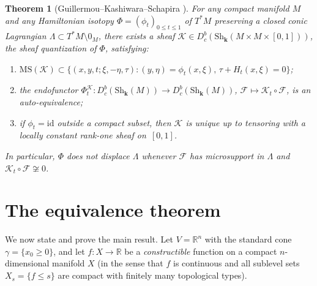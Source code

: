 \documentclass[12pt,a4paper]{amsart}
\newtheorem{theorem}{Theorem}[section]
\theoremstyle{definition}
\newcommand{\R}{\mathbb{R}}
\newcommand{\kk}{\mathbf{k}}                %
\newcommand{\Sh}{\mathrm{Sh}}               %
\newcommand{\Dbc}{D^b_c}                     %
\newcommand{\MS}{\mathrm{MS}}               %
\newcommand{\id}{\mathrm{id}}
\newcommand{\TsM}{T^*M}                     %
\begin{document}
\begin{theorem}[{Guillermou--Kashiwara--Schapira \cite[Thm.~1.7]{GKS2012}}]
  \label{thm:gks}
  For any compact manifold $M$ and any Hamiltonian isotopy
  $\Phi = (\phi_t)_{0 \leq t \leq 1}$ of $\TsM$ preserving a closed
  conic Lagrangian $\Lambda \subset \TsM \setminus 0_M$, there exists a
  sheaf $\mathcal{K} \in \Dbc(\Sh_\kk(M \times M \times [0,1]))$, the
  \emph{sheaf quantization of $\Phi$}, satisfying:
  \begin{enumerate}
    \item[\textup{(i)}]
      $\MS(\mathcal{K}) \subset \{(x,y,t;\xi,-\eta,\tau) : (y,\eta) =
      \phi_t(x,\xi),\, \tau + H_t(x,\xi) = 0\}$;
    \item[\textup{(ii)}]
      the endofunctor $\Phi_t^{\mathcal{K}}:
      \Dbc(\Sh_\kk(M)) \to \Dbc(\Sh_\kk(M))$,
      $\mathcal{F} \mapsto \mathcal{K}_t \circ \mathcal{F}$,
      is an auto-equivalence;
    \item[\textup{(iii)}]
      if $\phi_t = \id$ outside a compact subset, then $\mathcal{K}$ is
      unique up to tensoring with a locally constant rank-one sheaf
      on~$[0,1]$.
  \end{enumerate}
  In particular, $\Phi$ does not displace $\Lambda$ whenever
  $\mathcal{F}$ has microsupport in $\Lambda$ and $\mathcal{K}_t \circ
  \mathcal{F} \not\cong 0$.
\end{theorem}

\section{The equivalence theorem}
\label{sec:equivalence}

We now state and prove the main result.  Let $V = \R^n$ with the
standard cone $\gamma = \{x_0 \geq 0\}$, and let
$f: X \to \R$ be a \emph{constructible} function on a compact
$n$-dimensional manifold $X$ (in the sense that $f$ is continuous and
all sublevel sets $X_s = \{f \leq s\}$ are compact with finitely many
topological types).
\end{document}
